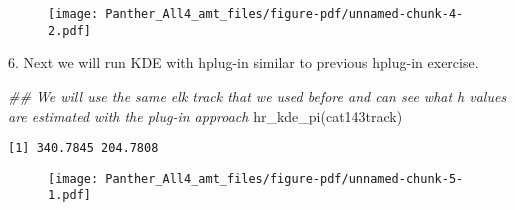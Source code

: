 \documentclass[
  letterpaper,
]{book}
\newenvironment{Shaded}{\begin{snugshade}}{\end{snugshade}}
\newcommand{\AttributeTok}[1]{\textcolor[rgb]{0.40,0.45,0.13}{#1}}
\newcommand{\DocumentationTok}[1]{\textcolor[rgb]{0.37,0.37,0.37}{\textit{#1}}}
\newcommand{\FloatTok}[1]{\textcolor[rgb]{0.68,0.00,0.00}{#1}}
\newcommand{\FunctionTok}[1]{\textcolor[rgb]{0.28,0.35,0.67}{#1}}
\newcommand{\NormalTok}[1]{\textcolor[rgb]{0.00,0.23,0.31}{#1}}
\newcommand{\OtherTok}[1]{\textcolor[rgb]{0.00,0.23,0.31}{#1}}
\newcommand{\SpecialCharTok}[1]{\textcolor[rgb]{0.37,0.37,0.37}{#1}}
\begin{document}
\begin{figure}[H]

{\centering \texttt{[image: Panther\_All4\_amt\_files/figure-pdf/unnamed-chunk-4-2.pdf]}

}

\end{figure}

6. Next we will run KDE with hplug-in similar to previous hplug-in
exercise.

\begin{Shaded}
\begin{Highlighting}[]
\DocumentationTok{\#\# We will use the same elk track that we used before and can see what h values are estimated with the plug{-}in approach}
\FunctionTok{hr\_kde\_pi}\NormalTok{(cat143track)}
\end{Highlighting}
\end{Shaded}

\begin{verbatim}
[1] 340.7845 204.7808
\end{verbatim}

\begin{Shaded}
\end{Shaded}

\begin{figure}[H]

{\centering \texttt{[image: Panther\_All4\_amt\_files/figure-pdf/unnamed-chunk-5-1.pdf]}

}

\end{figure}
\end{document}
